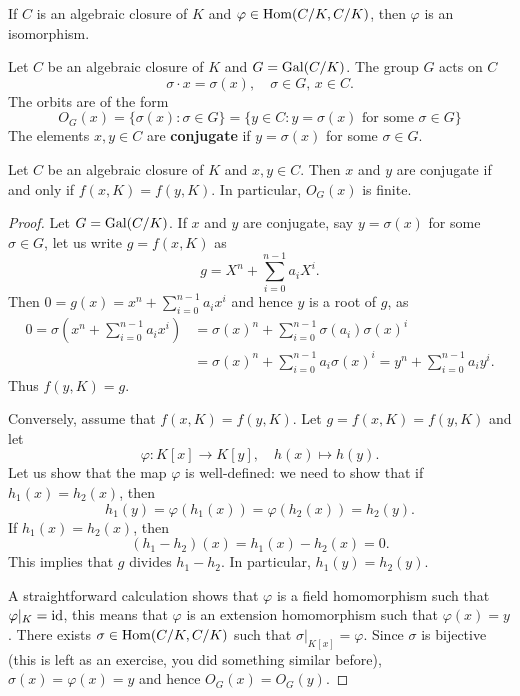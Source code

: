 \begin{exercise}
\label{xca:C/K_bijective}
If $C$ is an algebraic closure of $K$ and 
$\varphi\in\operatorname{Hom}(C/K,C/K)$, 
then $\varphi$ is an isomorphism. 
\end{exercise}


Let $C$ be an algebraic closure of $K$ and 
$G=\operatorname{Gal}(C/K)$. The group $G$ acts on $C$
\[
\sigma\cdot x=\sigma(x),\quad
\sigma\in G,\,x\in C.
\]
The orbits 
are of the form 
\[
O_G(x)=\{\sigma(x):\sigma\in G\}
=\{y\in C:y=\sigma(x)\text{ for some $\sigma\in G$}\}
\]
The elements $x,y\in C$ are \textbf{conjugate} 
if $y=\sigma(x)$ for some $\sigma\in G$. 

\begin{proposition}
\label{pro:conjugate}
    Let $C$ be an algebraic closure of $K$ and $x,y\in C$. Then 
    $x$ and $y$ are conjugate if and only if $f(x,K)=f(y,K)$. In particular, 
    $O_G(x)$ is finite. 
\end{proposition}

\begin{proof}
    Let $G=\operatorname{Gal}(C/K)$. 
    If $x$ and $y$ are conjugate, say $y=\sigma(x)$ for some $\sigma\in G$, 
    let us write $g=f(x,K)$ as 
    \[
    g=X^n+\sum_{i=0}^{n-1} a_iX^i. 
    \]
    Then $0=g(x)=x^n+\sum_{i=0}^{n-1}a_ix^i$ and hence $y$ is
    a root of $g$, as 
    \begin{align*}
    0=\sigma\left(x^n+\sum_{i=0}^{n-1}a_ix^i\right)
    &=\sigma(x)^n+\sum_{i=0}^{n-1}\sigma(a_i)\sigma(x)^i\\
    &=\sigma(x)^n+\sum_{i=0}^{n-1}a_i\sigma(x)^i
    =y^n+\sum_{i=0}^{n-1}a_iy^i.
    \end{align*}
    Thus $f(y,K)=g$. 
    
    Conversely, assume that $f(x,K)=f(y,K)$. Let
    $g=f(x,K)=f(y,K)$ and let 
    \[
    \varphi\colon K[x]\to K[y],
    \quad
    h(x)\mapsto h(y).
    \]
    Let us show that the map $\varphi$ is well-defined: we need to show 
    that if 
    $h_1(x)=h_2(x)$, then 
    \[
    h_1(y)=\varphi(h_1(x))=\varphi(h_2(x))=h_2(y).
    \]
    If $h_1(x)=h_2(x)$, then 
    \[
    (h_1-h_2)(x)=h_1(x)-h_2(x)=0.
    \]
    This implies
    that $g$ divides $h_1-h_2$. In particular, $h_1(y)=h_2(y)$.
    
    A straightforward calculation shows that $\varphi$ is a field 
    homomorphism such that $\varphi|_K=\operatorname{id}$, this means that
    $\varphi$ is 
    an extension homomorphism such that $\varphi(x)=y$. There exists
    $\sigma\in\operatorname{Hom}(C/K,C/K)$ such that 
    $\sigma|_{K[x]}=\varphi$. Since $\sigma$ is bijective 
    (this is left as an exercise, you did something similar before), 
    $\sigma(x)=\varphi(x)=y$ and hence 
    $O_G(x)=O_G(y)$. 
\end{proof}

